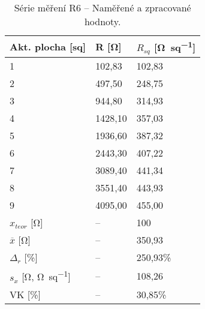 \begin{table}[h!]
    \caption{Série měření R6 -- Naměřené a zpracované hodnoty.}
    \centering
    \def\arraystretch{1.4}
    \begin{tabular}{l|l|l}
        Akt. plocha [sq]                              & R [\unit{\ohm}]    & \(R_{sq}\) [\unit{\ohm\per sq}]  \\ \hline\hline
        1                                             & 102,83   & 102,83 \\ \hline
        2                                             & 497,50   & 248,75 \\ \hline
        3                                             & 944,80   & 314,93 \\ \hline
        4                                             & 1428,10  & 357,03 \\ \hline
        5                                             & 1936,60  & 387,32 \\ \hline
        6                                             & 2443,30  & 407,22 \\ \hline
        7                                             & 3089,40  & 441,34 \\ \hline
        8                                             & 3551,40  & 443,93 \\ \hline
        9                                             & 4095,00  & 455,00 \\ \hline\hline
        \(x_{teor} \) [\unit{\ohm}]                   & --       & 100    \\ \hline
        \(\overline{x} \) [\unit{\ohm}]               & --       & 350,93 \\ \hline
        \(\Delta_{r} \) [\unit{\percent}]             & --       & 250,93\%\\ \hline\hline
        \(s_{x} \) [\unit{\ohm}, \unit{\ohm\per sq}]  & --       & 108,26   \\ \hline
        VK [\unit{\percent}]                          & --       & 30,85\% \\ 
    \end{tabular}
    \label{tab:r6_hodnoty}
\end{table}